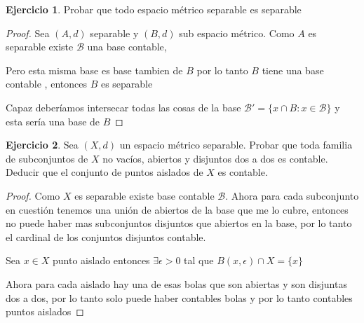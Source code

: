 \documentclass[12pt]{report}
\theoremstyle{definition}
\newtheorem{ej}{Ejercicio}
\begin{document}
\begin{ej}
Probar que todo espacio métrico separable es separable
\begin{proof}
	Sea $(A,d)$ separable y $(B,d)$ sub espacio métrico. Como $A$ es separable existe $\mathcal{B}$ una base contable,

	Pero esta misma base es base tambien de $B$ por lo tanto $B$ tiene una base contable , entonces $B$ es separable

	Capaz deberíamos intersecar todas las cosas de la base $\mathcal{B}' = \{x \cap B : x \in \mathcal{B}\}$ y esta sería una base de $B$ 
\end{proof}
\end{ej}

\begin{ej}
	Sea $(X,d)$ un espacio métrico separable. Probar que toda familia de subconjuntos de $X$ no vacíos, abiertos y disjuntos dos a dos es contable. Deducir que el conjunto de puntos aislados de $X$ es contable.
	\begin{proof}
		Como $X$ es separable existe base contable $\mathcal{B}$. Ahora para cada subconjunto en cuestión tenemos una unión de abiertos de la base que me lo cubre, entonces no puede haber mas subconjuntos disjuntos que abiertos en la base, por lo tanto el cardinal de los conjuntos disjuntos contable.

		Sea $x \in X$ punto aislado entonces $\exists \epsilon >0$ tal que $B(x,\epsilon) \cap X = \{x\}$

		Ahora para cada aislado hay una de esas bolas que son abiertas y son disjuntas dos a dos, por lo tanto solo puede haber contables bolas y por lo tanto contables puntos aislados
	\end{proof}
\end{ej}
\end{document}
